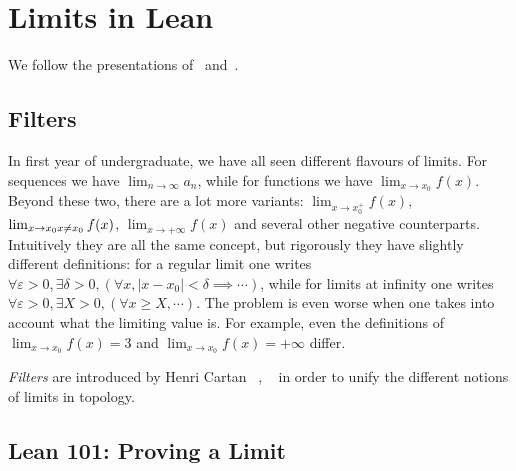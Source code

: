 \section{Limits in Lean}

We follow the presentations of~\cite{HIH2013} and~\cite{BCM2020}.

\subsection{Filters}


In first year of undergraduate, we have all seen different flavours of limits. For sequences we have \(\lim_{n \to \infty} a_n\), while for functions we have \(\lim_{x \to x_0} f(x)\). Beyond these two, there are a lot more variants: \(\lim_{x \to x_0^+} f(x)\), \(\lim_{x \to x_0 \\ x \neq x_0} f(x)\), \(\lim_{x \to +\infty} f(x)\) and several other negative counterparts. Intuitively they are all the same concept, but rigorously they have slightly different definitions: for a regular limit one writes \(\forall \varepsilon > 0, \exists \delta > 0, (\forall x, |x - x_0| < \delta \implies \cdots)\), while for limits at infinity one writes \(\forall \varepsilon > 0, \exists X > 0, (\forall x \geq X, \cdots)\). The problem is even worse when one takes into account what the limiting value is. For example, even the definitions of \(\lim_{x \to x_0} f(x) = 3\) and \(\lim_{x \to x_0} f(x) = +\infty\) differ.

\textit{Filters} are introduced by Henri Cartan ~\cite{Cartan1937a}, ~\cite{Cartan1937b} in order to unify the different notions of limits in topology.

\subsection{Lean 101: Proving a Limit}

